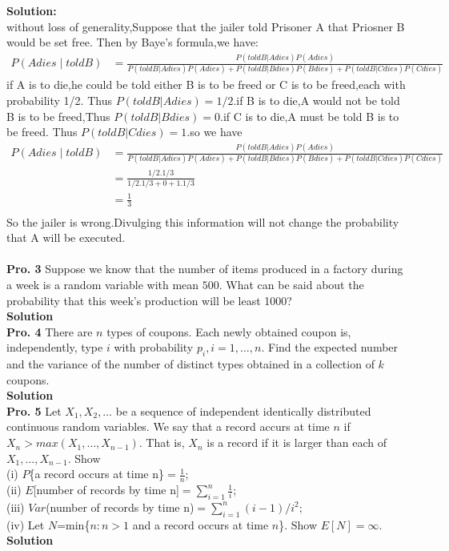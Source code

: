 \documentclass[12pt,onecolumn,journal]{IEEEtran}
\begin{document}
\textbf{Solution:}
\\
\textcolor[rgb]{1,0,0}
{
without loss of generality,Suppose that the jailer told Prisoner A that Priosner B would be set free.
Then by Baye's formula,we have:
\[
\begin{aligned}
P(A dies\mid told B)
&=\frac{P(told B|A dies)P(A dies)}{P(told B|A dies)P(A dies)+P(told B|B dies)P(B dies)+P(told B|C dies)P(C dies)}&
\end{aligned}
\]
if A is to die,he could be told either B is to be freed or C is to be freed,each with probability 1/2.
Thus $P(told B|A dies)=1/2$.if B is to die,A would not be told B is to be freed,Thus $P(told B|B dies)=0$.if C is to die,A must be told B is to be freed.
Thus $P(told B|C dies)=1$.so we have
\[
\begin{aligned}
P(A dies\mid told B)
&=\frac{P(told B|A dies)P(A dies)}{P(told B|A dies)P(A dies)+P(told B|B dies)P(B dies)+P(told B|C dies)P(C dies)}& \\
&=\frac{1/2.1/3}{1/2.1/3+0+1.1/3}& \\
&=\frac{1}{3}&\\
\end{aligned}
\]
}
So the jailer is wrong.Divulging this information will not change the probability that A will be executed.
\\
\\
\textbf{Pro. 3} Suppose we know that the number of items produced in a factory during a week is a random variable with mean $500$. What can be said about the probability that this week's production will be least 1000?
\\
\textbf{Solution}
\\

\textbf{Pro. 4} There are $n$ types of coupons. Each newly obtained coupon is, independently, type $i$ with probability $p_i, i=1,\ldots,n$. Find the expected number and the variance of the number of distinct types obtained in a collection of $k$ coupons.
\\
\textbf{Solution}
\\

\textbf{Pro. 5} Let $X_1, X_2, \ldots$ be a sequence of independent identically distributed continuous random variables. We say that a record accurs at time $n$ if $X_n>max(X_1,\ldots,X_{n-1})$. That is, $X_n$ is a record if it is larger than each of $X_1,\ldots,X_{n-1}$. Show\\
(i) $P$\{a record occurs at time n\}$=\frac{1}{n}$;\\
(ii) $E$[number of records by time n]$=\sum^n_{i=1}{\frac{1}{i}}$;\\
(iii) $Var$(number of records by time n)$=\sum^n_{i=1}{(i-1)/i^2}$;\\
(iv) Let $N$=min\{$n:n>1$ and a record occurs at time $n$\}. Show $E[N]=\infty$.
\\
\textbf{Solution}
\\
\end{document}

